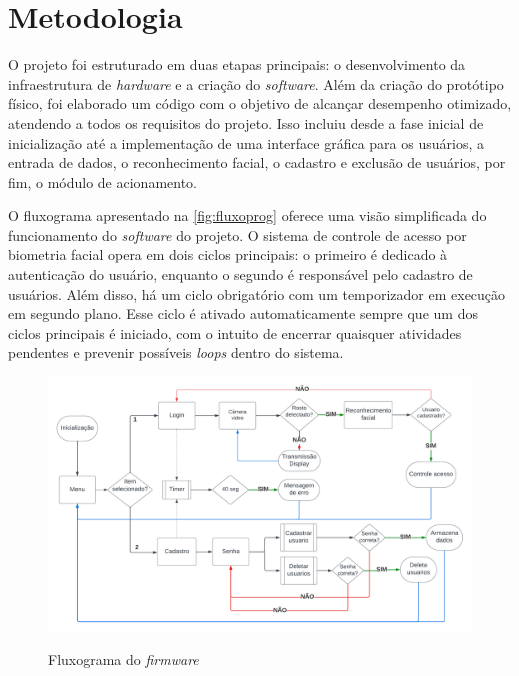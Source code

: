 
\chapter{Metodologia}\label{cap:materialemetodos}

O projeto foi estruturado em duas etapas principais: o desenvolvimento da
infraestrutura de \textit{hardware} e a criação do \textit{software}.
Além da criação do protótipo físico, foi elaborado um código com o 
objetivo de alcançar desempenho otimizado, atendendo a todos os 
requisitos do projeto. Isso incluiu desde a fase inicial de inicialização 
até a implementação de uma interface gráfica para os usuários, a entrada 
de dados, o reconhecimento facial, o cadastro e exclusão de usuários, 
por fim, o módulo de acionamento.

O fluxograma apresentado na \autoref{fig:fluxoprog} oferece uma visão
simplificada do funcionamento do \textit{software} do projeto. O sistema
de controle de acesso por biometria facial opera em dois ciclos principais:
o primeiro é dedicado à autenticação do usuário, enquanto o segundo é responsável
pelo cadastro de usuários. Além disso, há um ciclo obrigatório com um
temporizador em execução em segundo plano. Esse ciclo é ativado
automaticamente sempre que um dos ciclos principais é iniciado, com o intuito
de encerrar quaisquer atividades pendentes e prevenir possíveis \textit{loops}
dentro do sistema.

\begin{figure}[h!]
    \centering
    \caption{Fluxograma do \textit{firmware}}
    \includegraphics[scale=0.25]{figuras/fluxo_app.png}
    \fonte{}%
    \label{fig:fluxoprog}
    \centering
\end{figure}

